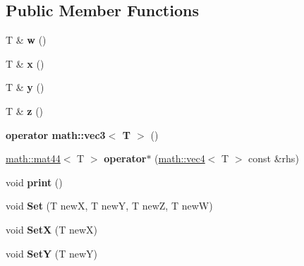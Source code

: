 \subsection*{Public Member Functions}
\begin{DoxyCompactItemize}
\item 
\hypertarget{classmath_1_1vec4_ae29babb2f7feddd0682cee16e2e7423c}{
T \& {\bfseries w} ()}
\label{classmath_1_1vec4_ae29babb2f7feddd0682cee16e2e7423c}

\item 
\hypertarget{classmath_1_1vec4_adb62edeee673cf471c4f80ca82ca2995}{
T \& {\bfseries x} ()}
\label{classmath_1_1vec4_adb62edeee673cf471c4f80ca82ca2995}

\item 
\hypertarget{classmath_1_1vec4_af24ce6557df36a22ee17946a8cb3ef67}{
T \& {\bfseries y} ()}
\label{classmath_1_1vec4_af24ce6557df36a22ee17946a8cb3ef67}

\item 
\hypertarget{classmath_1_1vec4_a15af37a2f72c15ea777516eb9ced43e7}{
T \& {\bfseries z} ()}
\label{classmath_1_1vec4_a15af37a2f72c15ea777516eb9ced43e7}

\item 
\hypertarget{classmath_1_1vec4_a3f14cbf091c8f58973f978b55a2744d5}{
{\bfseries operator math::vec3$<$ T $>$} ()}
\label{classmath_1_1vec4_a3f14cbf091c8f58973f978b55a2744d5}

\item 
\hypertarget{classmath_1_1vec4_a997a5c8cf9080ce670644ba9a1454407}{
\hyperlink{classmath_1_1mat44}{math::mat44}$<$ T $>$ {\bfseries operator$\ast$} (\hyperlink{classmath_1_1vec4}{math::vec4}$<$ T $>$ const \&rhs)}
\label{classmath_1_1vec4_a997a5c8cf9080ce670644ba9a1454407}

\item 
\hypertarget{classmath_1_1vec4_a48e9b9e91a4ff955973b346b957337c6}{
void {\bfseries print} ()}
\label{classmath_1_1vec4_a48e9b9e91a4ff955973b346b957337c6}

\item 
\hypertarget{classmath_1_1vec4_a455ee3b682ee0036a90794b1235ec615}{
void {\bfseries Set} (T newX, T newY, T newZ, T newW)}
\label{classmath_1_1vec4_a455ee3b682ee0036a90794b1235ec615}

\item 
\hypertarget{classmath_1_1vec4_a59f1ffa6b8218c9568afd841bef85825}{
void {\bfseries SetX} (T newX)}
\label{classmath_1_1vec4_a59f1ffa6b8218c9568afd841bef85825}

\item 
\hypertarget{classmath_1_1vec4_ab5a1f413c86ede41967ada2b72059685}{
void {\bfseries SetY} (T newY)}
\label{classmath_1_1vec4_ab5a1f413c86ede41967ada2b72059685}


\end{DoxyCompactItemize}
